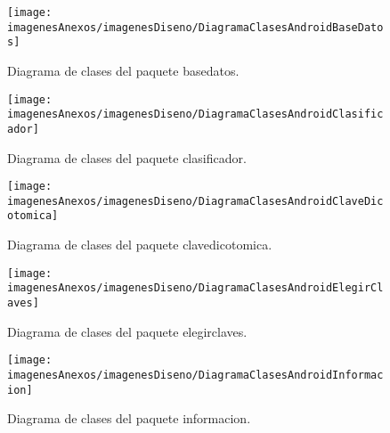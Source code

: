 \begin{itemize}
\end{itemize}

\newpage
\begin{figure}[h]
    \begin{center}%
        \begin{center}%
          \texttt{[image: imagenesAnexos/imagenesDiseno/DiagramaClasesAndroidBaseDatos]}%
          \caption{Diagrama de clases del paquete basedatos.}%
          \label{figDiagramaClasesAndroidBaseDatos}%
        \end{center}%
  	\end{center}%
\end{figure}%
\begin{figure}[h]
    \begin{center}%
        \begin{center}%
          \texttt{[image: imagenesAnexos/imagenesDiseno/DiagramaClasesAndroidClasificador]}%
          \caption{Diagrama de clases del paquete clasificador.}%
          \label{figDiagramaClasesAndroidClasificador}%
        \end{center}%
  	\end{center}%
\end{figure}%
\begin{figure}[h]
    \begin{center}%
        \begin{center}%
          \texttt{[image: imagenesAnexos/imagenesDiseno/DiagramaClasesAndroidClaveDicotomica]}%
          \caption{Diagrama de clases del paquete clavedicotomica.}%
          \label{figDiagramaClasesAndroidClaveDicotomica}%
        \end{center}%
  	\end{center}%
\end{figure}%
\begin{figure}[h]
    \begin{center}%
        \begin{center}%
          \texttt{[image: imagenesAnexos/imagenesDiseno/DiagramaClasesAndroidElegirClaves]}%
          \caption{Diagrama de clases del paquete elegirclaves.}%
          \label{figDiagramaClasesAndroidElegirClaves}%
        \end{center}%
  	\end{center}%
\end{figure}%
\begin{figure}[h]
    \begin{center}%
        \begin{center}%
          \texttt{[image: imagenesAnexos/imagenesDiseno/DiagramaClasesAndroidInformacion]}%
          \caption{Diagrama de clases del paquete informacion.}%
          \label{figDiagramaClasesAndroidInformacion}%
        \end{center}%
  	\end{center}%
\end{figure}%
